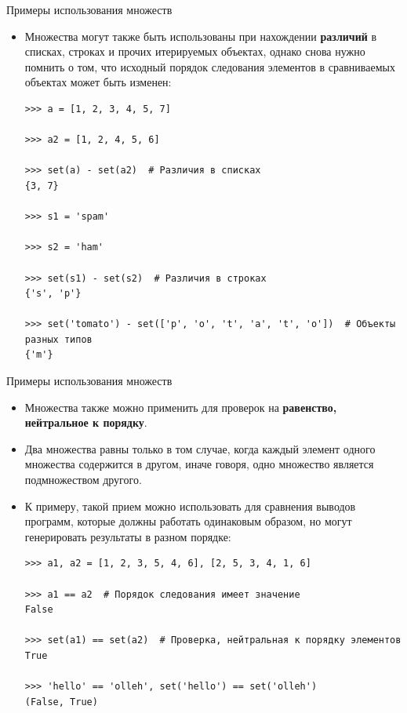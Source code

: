 \documentclass[aspectratio=169, mathserif]{beamer}%
\begin{document}
\begin{frame}[fragile]{Примеры использования множеств}
	
\begin{itemize}
\item Множества могут также быть использованы при нахождении \textcolor{extraorange}{\textbf{различий}} в списках, строках и прочих итерируемых объектах, однако снова нужно помнить о том, что исходный порядок следования элементов в сравниваемых объектах может быть изменен:

\begin{verbatim}
>>> a = [1, 2, 3, 4, 5, 7]

>>> a2 = [1, 2, 4, 5, 6]

>>> set(a) - set(a2)  # Различия в списках
{3, 7}

>>> s1 = 'spam'

>>> s2 = 'ham'

>>> set(s1) - set(s2)  # Различия в строках
{'s', 'p'}

>>> set('tomato') - set(['p', 'o', 't', 'a', 't', 'o'])  # Объекты разных типов
{'m'}
\end{verbatim}
\end{itemize}
\vfill
\end{frame}

\begin{frame}[fragile]{Примеры использования множеств}
\scriptsize
\begin{itemize}
\item Множества также можно применить для проверок на \textcolor{extraorange}{\textbf{равенство, нейтральное к порядку}}. 
\item Два множества равны только в том случае, когда каждый элемент одного множества содержится в другом, иначе говоря, одно множество является подмножеством другого. 
\item К примеру, такой прием можно использовать для сравнения выводов программ, которые должны работать одинаковым образом, но могут генерировать результаты в разном порядке:

\begin{verbatim}
>>> a1, a2 = [1, 2, 3, 5, 4, 6], [2, 5, 3, 4, 1, 6]

>>> a1 == a2  # Порядок следования имеет значение
False

>>> set(a1) == set(a2)  # Проверка, нейтральная к порядку элементов
True

>>> 'hello' == 'olleh', set('hello') == set('olleh')
(False, True)
\end{verbatim}
\end{itemize}
\vfill
\end{frame}


\end{document}
